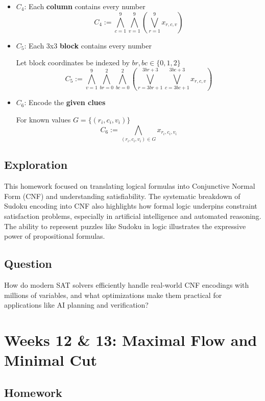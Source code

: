 \documentclass[11pt]{article}
\begin{document}
\begin{itemize}[leftmargin=*]
\begin{itemize}
    \item \( C_4 \): Each \textbf{column} contains every number
    \[
    C_4 := \bigwedge_{c=1}^{9} \bigwedge_{v=1}^{9} \left( \bigvee_{r=1}^{9} x_{r,c,v} \right)
    \]

    \item \( C_5 \): Each 3x3 \textbf{block} contains every number

    Let block coordinates be indexed by \( br, bc \in \{0,1,2\} \)
    \[
    C_5 := \bigwedge_{v=1}^{9} \bigwedge_{br=0}^{2} \bigwedge_{bc=0}^{2} \left( \bigvee_{r=3br+1}^{3br+3} \bigvee_{c=3bc+1}^{3bc+3} x_{r,c,v} \right)
    \]

    \item \( C_6 \): Encode the \textbf{given clues}

    For known values \( G = \{(r_i, c_i, v_i)\} \)
    \[
    C_6 := \bigwedge_{(r_i, c_i, v_i) \in G} x_{r_i,c_i,v_i}
    \]
\end{itemize}

\end{itemize}

\subsection{Exploration}

This homework focused on translating logical formulas into Conjunctive Normal Form (CNF) and understanding satisfiability. The systematic breakdown of Sudoku encoding into CNF also highlights how formal logic underpins constraint satisfaction problems, especially in artificial intelligence and automated reasoning. The ability to represent puzzles like Sudoku in logic illustrates the expressive power of propositional formulas.

\subsection{Question}

How do modern SAT solvers efficiently handle real-world CNF encodings with millions of variables, and what optimizations make them practical for applications like AI planning and verification?

\section{Weeks 12 \& 13: Maximal Flow and Minimal Cut}

\subsection{Homework}
\end{document}
